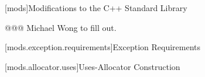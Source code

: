 
[mods]{Modifications to the C++ Standard Library}

@@@ Michael Wong to fill out.

[mods.exception.requirements]{Exception Requirements}

[mods.allocator.uses]{Uses-Allocator Construction}
